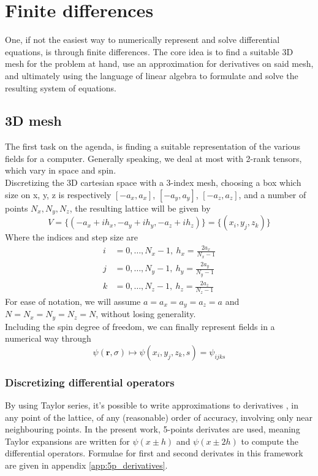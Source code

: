 \section{Finite differences}
One, if not the easiest way to numerically represent and solve differential equations, is through finite differences. The core idea is to find a suitable 3D mesh for the problem at hand, use an approximation for derivatives on said mesh, and ultimately using the language of linear algebra to formulate and solve the resulting system of equations.
\subsection{3D mesh}
The first task on the agenda, is finding a suitable representation of the various fields for a computer.
Generally speaking, we deal at most with 2-rank tensors, which vary in space and spin. 
\\Discretizing the 3D cartesian space with a 3-index mesh, choosing a box which size on x, y, z is respectively $[-a_x, a_x]$, $[-a_y, a_y]$, $[-a_z, a_z]$, and a number of points $N_x, N_y, N_z$, the resulting lattice will be given by
\begin{equation*}
V=\{(-a_x+ih_x, -a_y+ih_y, -a_z+ih_z)\} = \{(x_i, y_j,z_k)\} 
\end{equation*}
Where the indices and step size are
\begin{align*}
  i&=0,\ldots,N_x-1,\ h_x = \frac{2a_x}{N_x-1}\\
  j&=0,\ldots,N_y-1,\ h_y = \frac{2a_y}{N_y-1}\\
  k&=0,\ldots,N_z-1,\ h_z = \frac{2a_z}{N_z-1}
\end{align*}
For ease of notation, we will assume $a=a_x=a_y=a_z=a$ and $N=N_x=N_y=N_z=N$, without losing generality.
\\Including the spin degree of freedom, we can finally represent fields in a numerical way through
\begin{equation}
    \psi(\bm r, \sigma) \mapsto \psi(x_i, y_j, z_k, s) = \psi_{ijks}
\end{equation}
\subsubsection{Discretizing differential operators}
By using Taylor series, it's possible to write approximations to derivatives \cite{Zhou1993}, in any point of the lattice, of any (reasonable) order of accuracy, involving only near neighbouring points. In the present work, 5-points derivates are used, meaning Taylor expansions are written for $\psi(x\pm h)$ and $\psi(x\pm 2h)$ to compute the differential operators. Formulae for first and second derivates in this framework are given in appendix \ref{app:5p_derivatives}.
